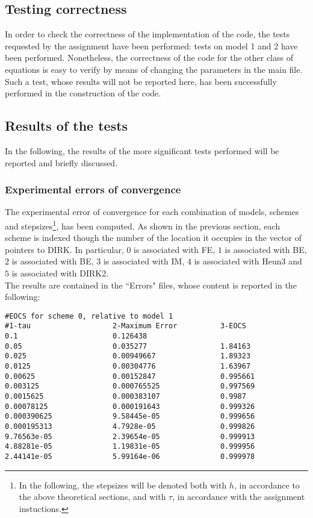 \documentclass[11pt]{article}
\theoremstyle{theorem}
\theoremstyle{definition}
\begin{document}
\subsection{Testing correctness}
In order to check the correctness of the implementation of the code, the tests requested by the assignment have been performed: tests on model 1 and 2 have been performed. Nonetheless, the correctness of the code for the other class of equations is easy to verify by means of changing the parameters in the main file. Such a test, whose results will not be reported here, has been successfully performed in the construction of the code.\\

\subsection{Results of the tests}
In the following, the results of the more significant tests performed will be reported and briefly discussed.\\

\subsubsection{Experimental errors of convergence}
The experimental error of convergence for each combination of models, schemes and stepsizes\footnote{In the following, the stepsizes will be denoted both with $h$, in accordance to the above theoretical sections, and with $\tau$, in accordance with the assignment instuctions.}, has been computed. As shown in the previous section, each scheme is indexed though the number of the location it occupies in the vector of pointers to DIRK. In particular, $0$ is associated with FE, $1$ is associated with BE, $2$ is associated with BE, $3$ is associated with IM, $4$ is associated with Heun3 and $5$ is associated with DIRK2.\\


 The results are contained in the ``Errors" files, whose content is reported in the following:


\begin{lstlisting}
#EOCS for scheme 0, relative to model 1
#1-tau                   2-Maximum Error          3-EOCS                   
0.1                      0.126438                 	
0.05                     0.035277                 1.84163
0.025                    0.00949667               1.89323
0.0125                   0.00304776               1.63967
0.00625                  0.00152847               0.995661
0.003125                 0.000765525              0.997569
0.0015625                0.000383107              0.9987
0.00078125               0.000191643              0.999326
0.000390625              9.58445e-05              0.999656
0.000195313              4.7928e-05               0.999826
9.76563e-05              2.39654e-05              0.999913
4.88281e-05              1.19831e-05              0.999956
2.44141e-05              5.99164e-06              0.999978
\end{lstlisting}
\end{document}
